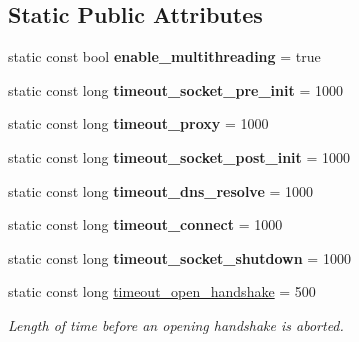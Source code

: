 \subsection*{Static Public Attributes}
\begin{DoxyCompactItemize}
\item 
\mbox{\label{classconfig_ad2ff809121a7a0c3ca9fa74190b6a683}} 
static const bool {\bfseries enable\+\_\+multithreading} = true
\item 
\mbox{\label{classconfig_ab70f11c91b7d43a9dbf4710df9d5b886}} 
static const long {\bfseries timeout\+\_\+socket\+\_\+pre\+\_\+init} = 1000
\item 
\mbox{\label{classconfig_a8b5ede90c164880d9c509a06fbe74cb4}} 
static const long {\bfseries timeout\+\_\+proxy} = 1000
\item 
\mbox{\label{classconfig_a32ac20993fbbaa83117d944c9ffb14a5}} 
static const long {\bfseries timeout\+\_\+socket\+\_\+post\+\_\+init} = 1000
\item 
\mbox{\label{classconfig_aa38fcb59d8b21a938c35a87c6acb34fc}} 
static const long {\bfseries timeout\+\_\+dns\+\_\+resolve} = 1000
\item 
\mbox{\label{classconfig_a2b37e99733d9bdcb7782be8303fa9458}} 
static const long {\bfseries timeout\+\_\+connect} = 1000
\item 
\mbox{\label{classconfig_a0e33b5245daabd6441db5cfd3cd32ccf}} 
static const long {\bfseries timeout\+\_\+socket\+\_\+shutdown} = 1000
\item 
\mbox{\label{classconfig_a6e7bdfe35c4f5c21439e62a19f246aa3}} 
static const long \mbox{\hyperlink{classconfig_a6e7bdfe35c4f5c21439e62a19f246aa3}{timeout\+\_\+open\+\_\+handshake}} = 500
\begin{DoxyCompactList}\small\item\em Length of time before an opening handshake is aborted. \end{DoxyCompactList}\item 
\mbox{\label{classconfig_a72a7ba41094b21293a0fa92634501dfa}} 

\end{DoxyCompactItemize}

